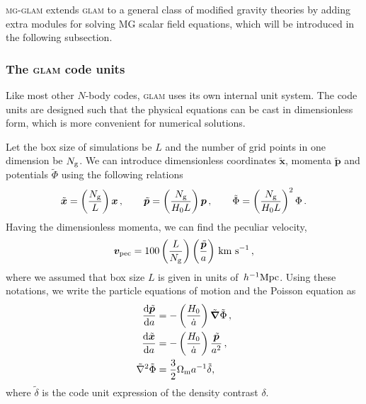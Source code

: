
\textsc{mg-glam} extends \textsc{glam} to a general class of modified gravity theories by adding extra modules for solving MG scalar field equations, which will be introduced in the following subsection.


\subsubsection{The \textsc{glam} code units}
\label{sec:glam_units}

Like most other $N$-body codes, \textsc{glam} uses its own internal unit system. The code units are designed such that the physical equations can be cast in dimensionless form, which is more convenient for numerical solutions.

Let the box size of simulations be $L$ and the number of grid points in one dimension be $N_{\rm g}$. We can introduce dimensionless coordinates $\tilde{\boldsymbol{x}}$, momenta $\tilde{\boldsymbol{p}}$ and potentials $\tilde{\Phi}$ using the following relations \citep{Klypin:2017iwu} 
\begin{equation}\label{eq:code_units}
\tilde{\boldsymbol{x}} = \left( \frac{N_{\rm g}}{L}\right) {\boldsymbol{x}} \,, \qquad
\tilde{\boldsymbol{p}} = \left( \frac{N_{\rm g}}{H_0 L}\right) {\boldsymbol{p}}\,, \qquad
\tilde\Phi = \left( \frac{N_{\rm g}}{H_0 L}\right)^2\Phi\,.
\end{equation}
Having the dimensionless momenta, we can find the peculiar velocity,
\begin{equation}
{\boldsymbol{v}}_{\rm pec} = 100 \left(\frac{L}{N_{\rm g}}\right)\left(\frac{\tilde{\boldsymbol{p}}}{a}\right)\,{\rm km}~{\rm s}^{-1}\,,
\end{equation}
where we assumed that box size $L$ is given in units of $\,h^{-1}{\rm Mpc}$.
Using these notations, we write the particle equations of motion and the Poisson equation as
\begin{align}
\frac{{\rm d}\tilde{\boldsymbol{p}}}{{\rm d} a} &= -\left(\frac{H_0}{\dot{a}}\right)\tilde{\boldsymbol{\nabla}}\tilde{\Phi}\,,\\
\frac{{\rm d}\tilde{\boldsymbol{x}}}{{\rm d} a} &= -\left(\frac{H_0}{\dot{a}}\right)\frac{\tilde{\boldsymbol{p}}}{a^2}\,,\\
\label{eq:GR_poisson_codeunit}\tilde{\nabla}^2\tilde{\Phi} &= \frac{3}{2}\Omega_{\rm m} a^{-1} \tilde{\delta},
\end{align}
where $\tilde{\delta}$ is the code unit expression of the density contrast $\delta$.

